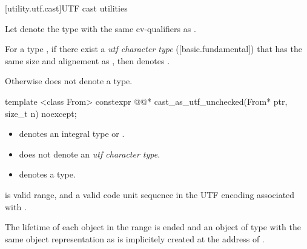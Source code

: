 \documentclass{wg21}
\begin{document}
\begin{addedblock}
[utility.utf.cast]{UTF cast utilities}

Let  denote the type  with the same cv-qualifiers as .

For a type , if there exist a \emph{utf character type} ([basic.fundamental])  that has the same size and alignement as , then
 denotes .

Otherwise  does not denote a type.

\begin{itemdecl}
template <class From>
constexpr @@* cast_as_utf_unchecked(From* ptr, size_t n) noexcept;
\end{itemdecl}
\begin{itemdescr}
    \constraints
    \begin{itemize}
        \item {} denotes an integral type or .
        \item {} does not denote an \emph{utf character type}.
        \item {} denotes a type.
    \end{itemize}

    \preconditions

     is valid range, and a valid code unit sequence in the UTF encoding associated with .

    \effects The lifetime of each object  in the range  is ended and an object of type
     with the same object representation as  is implicitely created at the address of .


\end{itemdescr}
\end{addedblock}
\end{document}
